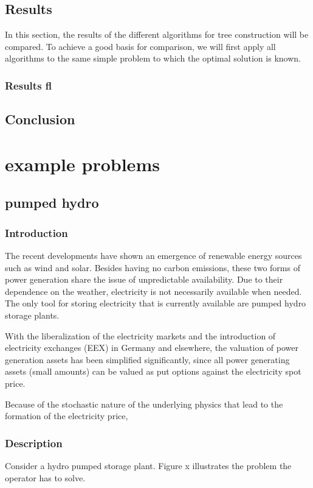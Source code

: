 \documentclass[a4paper, 12pt] {article}
\begin{document}
\subsection{Results}
In this section, the results of the different algorithms for tree construction will be compared. To achieve a good basis for comparison, we will first apply all algorithms to the same simple problem to which the optimal solution is known. 
\subsubsection{Results fl}
\subsection{Conclusion}
\section {example problems}
\subsection{pumped hydro}
\subsubsection {Introduction}
The recent developments have shown an emergence of renewable energy sources such as wind and solar. Besides having no carbon emissions, these two forms of power generation share the issue of unpredictable availability. Due to their dependence on the weather, electricity is not necessarily available when needed. The only tool for storing electricity that is currently available are pumped hydro storage plants.

With the liberalization of the electricity markets and the introduction of electricity exchanges (EEX) in Germany and elsewhere, the valuation of power generation assets has been simplified significantly, since all power generating assets (small amounts) can be valued as put options against the electricity spot price.

Because of the stochastic nature of the underlying physics that lead to the formation of the electricity price, 
\subsubsection{Description}
Consider a hydro pumped storage plant. Figure x illustrates the problem the operator has to solve.
\end{document}
